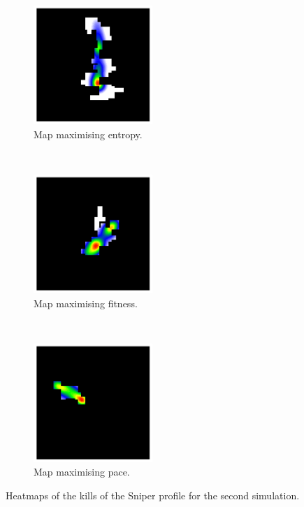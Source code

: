 \begin{figure}[H]
    \centering
    \begin{subfigure}[t]{0.3\textwidth}
        \centering
        \includegraphics[height=4.5cm]{Images/images/experiment_two/best_entropy_pop_1/kills_bot_1.png}
        \caption{Map maximising entropy.}
    \end{subfigure}%
    ~ 
    \begin{subfigure}[t]{0.3\textwidth}
        \centering
        \includegraphics[height=4.5cm]{Images/images/experiment_two/best_fitness_pop_1/kills_bot_1.png}
        \caption{Map maximising fitness.}
    \end{subfigure}
    ~ 
    \begin{subfigure}[t]{0.3\textwidth}
        \centering
        \includegraphics[height=4.5cm]{Images/images/experiment_two/best_pace_pop_1/kills_bot_1.png}
        \caption{Map maximising pace.}
    \end{subfigure}
    \caption{Heatmaps of the kills of the Sniper profile for the second simulation.}
\end{figure}
